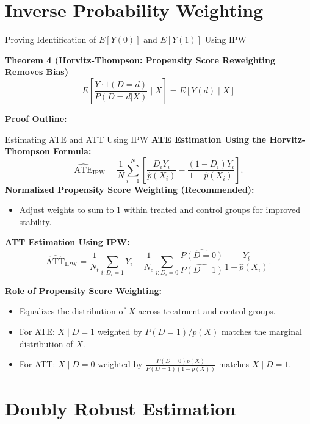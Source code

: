 \documentclass[xcolor=svgnames,t]{beamer}
\begin{document}
\section{Inverse Probability Weighting}


\begin{frame}{Proving Identification of \(E[Y(0)]\) and \(E[Y(1)]\) Using IPW}
    \begin{block}{\textbf{Theorem 4 (Horvitz-Thompson: Propensity Score Reweighting Removes Bias)}}
        \[
        E \left[ \frac{Y \cdot 1(D=d)}{P(D=d|X)} \mid X \right] = E[Y(d) \mid X]
        \]
        \end{block}

\textbf{Proof Outline:}

\end{frame}


\begin{frame}{Estimating ATE and ATT Using IPW}
\textbf{ATE Estimation Using the Horvitz-Thompson Formula:}
\[
\widehat{\text{ATE}}_{\text{IPW}} = \frac{1}{N} \sum_{i=1}^N \left[
\frac{D_i Y_i}{\widehat{p}(X_i)} - \frac{(1-D_i) Y_i}{1-\widehat{p}(X_i)}
\right].
\]
\pause
\textbf{Normalized Propensity Score Weighting (Recommended):}
\begin{itemize}
    \item Adjust weights to sum to 1 within treated and control groups for improved stability.
\end{itemize}

\pause

\textbf{ATT Estimation Using IPW:}
\[
\widehat{\text{ATT}}_{\text{IPW}} = \frac{1}{N_t} \sum_{i:D_i=1} Y_i - \frac{1}{N_c} \sum_{i:D_i=0} \frac{\widehat{P(D=0)}}{\widehat{P(D=1)}} \frac{Y_i}{1-\widehat{p}(X_i)}.
\]

\pause

\textbf{Role of Propensity Score Weighting:}
\begin{itemize}
    \item Equalizes the distribution of \(X\) across treatment and control groups.
    \item For ATE: \(X \mid D=1\) weighted by \(P(D=1)/p(X)\) matches the marginal distribution of \(X\).
    \item For ATT: \(X \mid D=0\) weighted by \(\frac{P(D=0)p(X)}{P(D=1)(1-p(X))}\) matches \(X \mid D=1\).
\end{itemize}
\end{frame}


\section{Doubly Robust Estimation}
\end{document}
